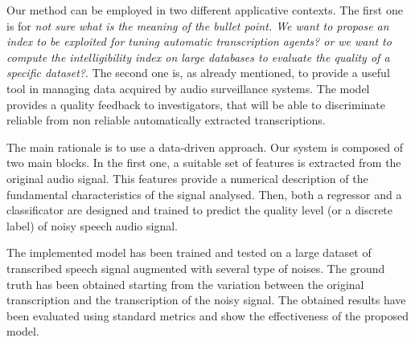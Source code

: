 Our method can be employed in two different applicative contexts. The first one is for \textit{not sure what is the meaning of the bullet point. We want to propose an index to be exploited for tuning automatic transcription agents? or we want to compute the intelligibility index on large databases to evaluate the quality of a specific dataset?}.
The second one is, as already mentioned, to provide a useful tool in managing data acquired by audio surveillance systems. The model provides a quality feedback to investigators, that will be able to discriminate reliable from non reliable automatically extracted transcriptions.
 

The main rationale is to use a data-driven approach. Our system is composed of two main blocks. In the first one, a suitable set of features is extracted from the original audio signal. This features provide a numerical description of the fundamental characteristics of the signal analysed. Then, both a regressor and a classificator are designed and trained to predict the quality level (or a discrete label) of noisy speech audio signal. 


The implemented model has been trained and tested on a large dataset of transcribed speech signal augmented with several type of noises. The ground truth has been obtained starting from the variation between the original transcription and the transcription of the noisy signal. The obtained results have been evaluated using standard metrics and show the effectiveness of the proposed model.


%
%
%	
%	


